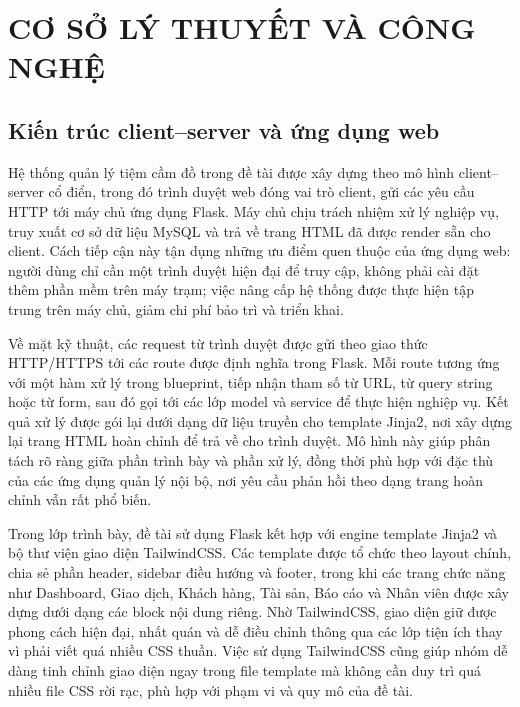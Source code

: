 \documentclass[13pt,a4paper]{extreport}
\begin{document}
\chapter{CƠ SỞ LÝ THUYẾT VÀ CÔNG NGHỆ}

\section{Kiến trúc client--server và ứng dụng web}

Hệ thống quản lý tiệm cầm đồ trong đề tài được xây dựng theo mô hình client--server cổ điển, trong đó trình duyệt web đóng vai trò client, gửi các yêu cầu HTTP tới máy chủ ứng dụng Flask. Máy chủ chịu trách nhiệm xử lý nghiệp vụ, truy xuất cơ sở dữ liệu MySQL và trả về trang HTML đã được render sẵn cho client. Cách tiếp cận này tận dụng những ưu điểm quen thuộc của ứng dụng web: người dùng chỉ cần một trình duyệt hiện đại để truy cập, không phải cài đặt thêm phần mềm trên máy trạm; việc nâng cấp hệ thống được thực hiện tập trung trên máy chủ, giảm chi phí bảo trì và triển khai.

Về mặt kỹ thuật, các request từ trình duyệt được gửi theo giao thức HTTP/HTTPS tới các route được định nghĩa trong Flask. Mỗi route tương ứng với một hàm xử lý trong blueprint, tiếp nhận tham số từ URL, từ query string hoặc từ form, sau đó gọi tới các lớp model và service để thực hiện nghiệp vụ. Kết quả xử lý được gói lại dưới dạng dữ liệu truyền cho template Jinja2, nơi xây dựng lại trang HTML hoàn chỉnh để trả về cho trình duyệt. Mô hình này giúp phân tách rõ ràng giữa phần trình bày và phần xử lý, đồng thời phù hợp với đặc thù của các ứng dụng quản lý nội bộ, nơi yêu cầu phản hồi theo dạng trang hoàn chỉnh vẫn rất phổ biến.

Trong lớp trình bày, đề tài sử dụng Flask kết hợp với engine template Jinja2 và bộ thư viện giao diện TailwindCSS. Các template được tổ chức theo layout chính, chia sẻ phần header, sidebar điều hướng và footer, trong khi các trang chức năng như Dashboard, Giao dịch, Khách hàng, Tài sản, Báo cáo và Nhân viên được xây dựng dưới dạng các block nội dung riêng. Nhờ TailwindCSS, giao diện giữ được phong cách hiện đại, nhất quán và dễ điều chỉnh thông qua các lớp tiện ích thay vì phải viết quá nhiều CSS thuần. Việc sử dụng TailwindCSS cũng giúp nhóm dễ dàng tinh chỉnh giao diện ngay trong file template mà không cần duy trì quá nhiều file CSS rời rạc, phù hợp với phạm vi và quy mô của đề tài.
\end{document}
